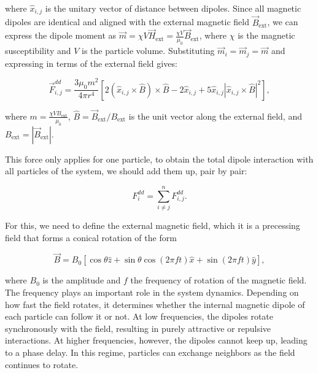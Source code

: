 where $\hat{x}_{i,j}$ is the unitary vector of distance between dipoles. Since all magnetic dipoles are identical and aligned with the external magnetic field $\vec{B}_{\text{ext}}$, we can express the dipole moment as $\vec{m} = \chi V \vec{H}_{\text{ext}} = \frac{\chi V}{\mu_0} \vec{B}_{\text{ext}}$, where $\chi$ is the magnetic susceptibility and $V$ is the particle volume. Substituting $\vec{m}_i = \vec{m}_j = \vec{m}$ and expressing in terms of the external field gives:

\begin{equation}
  \label{eq:dipoledipoleforce_Bext}
  \vec{F}^{dd}_{i,j} = \frac{3\mu_0 m^2}{4\pi r^4}
\left[ 2(\hat{x}_{i,j} \times \hat{B}) \times \hat{B} - 2\hat{x}_{i,j} + 5\hat{x}_{i,j}|\hat{x}_{i,j} \times \hat{B}|^2 \right],
\end{equation}

where $m = \frac{\chi V B_{\text{ext}}}{\mu_0}$, $\hat{B} = \vec{B}_{\text{ext}}/B_{\text{ext}}$ is the unit vector along the external field, and $B_{\text{ext}} = |\vec{B}_{\text{ext}}|$. 

This force only applies for one particle, to obtain the total dipole interaction with all particles of the system, we should add them up, pair by pair:

\begin{equation}
  F^{dd}_i = \sum^{n}_{i \neq j} F^{dd}_{i,j}.  
  \label{eq:dipolesum}
\end{equation}

For this, we need to define the external magnetic field, which it is a precessing field that forms a conical rotation of the form

\begin{equation}
  \vec{B} = B_0 [\cos{\theta}\hat{z} + \sin{\theta}\cos{(2\pi f t)}\hat{x} + \sin{(2\pi f t)}\hat{y}],
  \label{eq:magneticfield}
\end{equation}


where $B_0$ is the amplitude and $f$ the frequency of rotation of the magnetic field. The frequency plays an important role in the system dynamics. Depending on how fast the field rotates, it determines whether the internal magnetic dipole of each particle can follow it or not. At low frequencies, the dipoles rotate synchronously with the field, resulting in purely attractive or repulsive interactions. At higher frequencies, however, the dipoles cannot keep up, leading to a phase delay. In this regime, particles can exchange neighbors as the field continues to rotate.


